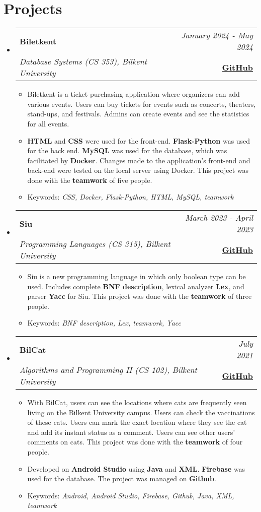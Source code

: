 \documentclass[a4paper,11pt]{article}
\makeatletter
\newcommand{\resumeProject}[4]{
\vspace{0.5mm}\item
    \begin{tabular*}{0.98\textwidth}[t]{l@{\extracolsep{\fill}}r}
    \textbf{#1} & \textit{\footnotesize{#3}} \\
    \footnotesize{\textit{#2}} & \footnotesize{#4}\end{tabular*}\vspace{-2.4mm}
}
\newcommand{\resumeSubHeadingListStart}{\begin{itemize}[leftmargin=*,labelsep=0mm]}
\newcommand{\resumeItemListStart}{\begin{justify}\begin{itemize}[leftmargin=3ex, rightmargin=2ex, noitemsep,labelsep=1.2mm,itemsep=0mm]\small}
\newcommand{\resumeSubHeadingListEnd}{\end{itemize}\vspace{2mm}}
\newcommand{\resumeItemListEnd}{\end{itemize}\end{justify}\vspace{-2mm}}
\makeatother
\begin{document}
\section{\textbf{Projects}}
    \resumeSubHeadingListStart
        \resumeProject
            {Biletkent} {Database Systems (CS 353), Bilkent University}
            {January 2024 - May 2024} {\href{https://github.com/memregn/Biletkent}{\textbf{\color{blue}GitHub}}}
                \resumeItemListStart
                    \item {Biletkent is a ticket-purchasing application where organizers can add various events. Users can buy tickets for events such as concerts, theaters, stand-ups, and festivals. Admins can create events and see the statistics for all events.}
                    \item {{\textbf{HTML}} and {\textbf{CSS}} were used for the front-end. {\textbf{Flask-Python}} was used for the back end. {\textbf{MySQL}} was used for the database, which was facilitated by {\textbf{Docker}}. Changes made to the application's front-end and back-end were tested on the local server using Docker. This project was done with the {\textbf{teamwork}} of five people.}
                    \item {Keywords: \emph{CSS, Docker, Flask-Python, HTML, MySQL, teamwork}}
                \resumeItemListEnd
        \resumeProject
            {Siu} {Programming Languages (CS 315), Bilkent University}
            {March 2023 - April 2023} {\href{https://github.com/memregn/Siu}{\textbf{\color{blue}GitHub}}}
                \resumeItemListStart
                    \item {Siu is a new programming language in which only boolean type can be used. Includes complete {\textbf{BNF description}}, lexical analyzer {\textbf{Lex}}, and parser {\textbf{Yacc}} for Siu. This project was done with the {\textbf{teamwork}} of three people.}
                    \item {Keywords: \emph{BNF description, Lex, teamwork, Yacc}}
                \resumeItemListEnd
        \resumeProject
            {BilCat} {Algorithms and Programming II (CS 102), Bilkent University}
            {July 2021} {\href{https://github.com/memregn/BilCat}{\textbf{\color{blue}GitHub}}}
                \resumeItemListStart
                    \item {With BilCat, users can see the locations where cats are frequently seen living on the Bilkent University campus. Users can check the vaccinations of these cats. Users can mark the exact location where they see the cat and add its instant status as a comment. Users can see other users' comments on cats. This project was done with the {\textbf{teamwork}} of four people. }
                    \item {Developed on {\textbf{Android Studio}} using {\textbf{Java}} and {\textbf{XML}}. {\textbf{Firebase}} was used for the database. The project was managed on {\textbf{Github}}.}
                    \item {Keywords: \emph{Android, Android Studio, Firebase, Github, Java, XML, teamwork}}
                \resumeItemListEnd
    \resumeSubHeadingListEnd
\vspace{-6.5mm}
\end{document}

